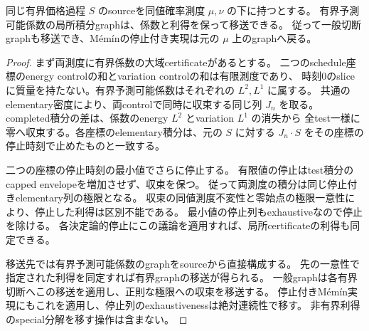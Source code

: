 \begin{proposition}[同値確率測度間の積分graphの移送]
同じ有界価格過程 $S$ のsourceを同値確率測度 $\mu,\nu$ の下に持つとする。
有界予測可能係数の局所積分graphは、係数と利得を保って移送できる。
従って一般切断graphも移送でき、Mémínの停止付き実現は元の $\mu$ 上のgraphへ戻る。
\end{proposition}
\begin{proof}
まず両測度に有界係数の大域certificateがあるとする。
二つのschedule座標のenergy controlの和とvariation controlの和は有限測度であり、
時刻0のsliceに質量を持たない。有界予測可能係数はそれぞれの $L^2,L^1$ に属する。
共通のelementary密度により、両controlで同時に収束する同じ列 $J_n$ を取る。
completed積分の差は、係数のenergy $L^2$ とvariation $L^1$ の消失から
全test一様に零へ収束する。各座標のelementary積分は、元の $S$ に対する
$J_n\mathbin{\cdot}S$ をその座標の停止時刻で止めたものと一致する。

二つの座標の停止時刻の最小値でさらに停止する。
有限値の停止はtest積分のcapped envelopeを増加させず、収束を保つ。
従って両測度の積分は同じ停止付きelementary列の極限となる。
収束の同値測度不変性と零始点の極限一意性により、停止した利得は区別不能である。
最小値の停止列もexhaustiveなので停止を除ける。
各決定論的停止にこの議論を適用すれば、局所certificateの利得も同定できる。

移送先では有界予測可能係数のgraphをsourceから直接構成する。
先の一意性で指定された利得を同定すれば有界graphの移送が得られる。
一般graphは各有界切断へこの移送を適用し、正則な極限への収束を移送する。
停止付きMémín実現にもこれを適用し、停止列のexhaustivenessは絶対連続性で移す。
非有界利得のspecial分解を移す操作は含まない。
\end{proof}


